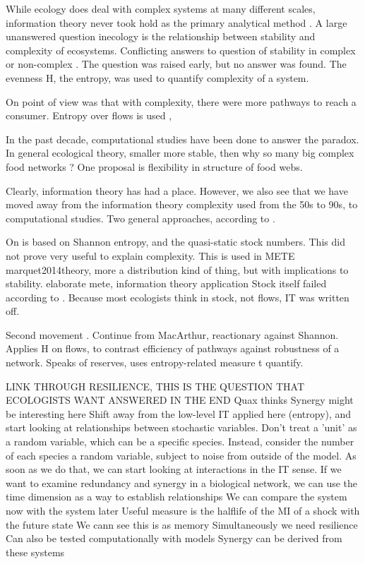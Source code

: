 \documentclass[../main.tex]{subfiles}
\begin{document}
While ecology does deal with complex systems at many different scales, information theory never took hold as the primary analytical method \cite{ulanowicz2001information}. %
A large unanswered question inecology is the relationship between stability and complexity of ecosystems.
Conflicting answers to question of stability in complex or non-complex \cite{pimm1984complexity}.
The question was raised early, but no answer was found.
The evenness H, the entropy, was used to quantify complexity of a system.

On point of view was that with complexity, there were more pathways to reach a consumer.
Entropy over flows is used \cite{macarthur1955fluctuations},

In the past decade, computational studies have been done to answer the paradox. 
In general ecological theory, smaller more stable, then why so many big complex food networks \cite{kondoh2003foraging}?
One proposal is flexibility in structure of food webs.

Clearly, information theory has had a place.
However, we also see that we have moved away from the information theory complexity used from the 50s to 90s, to computational studies.
Two general approaches, according to \citep{ulanowicz2001information}.

On is based on Shannon entropy, and the quasi-static stock numbers.
This did not prove very useful to explain complexity.
This is used in METE marquet2014theory, more a distribution kind of thing, but with implications to stability.
elaborate mete, information theory application \cite{phillips2006maximum} %
Stock itself failed according to \citep{ulanowicz2001information}.
Because most ecologists think in stock, not flows, IT was written off.

Second movement \cite{ulanowicz2009quantifying}.
Continue from MacArthur, reactionary against Shannon.
Applies H on flows, to contrast efficiency of pathways against robustness of a network.
Speaks of reserves, uses entropy-related measure t quantify.

LINK THROUGH RESILIENCE, THIS IS THE QUESTION THAT ECOLOGISTS WANT ANSWERED IN THE END
Quax thinks \cite{quax2017quantifying}
Synergy might be interesting here
Shift away from the low-level IT applied here (entropy), and start looking at relationships between stochastic variables.
Don't treat a 'unit' as a random variable, which can be a specific species.
Instead, consider the number of each species a random variable, subject to noise from outside of the model.
As soon as we do that, we can start looking at interactions in the IT sense.
If we want to examine redundancy and synergy in a biological network, we can use the time dimension as a way to establish relationships
We can compare the system now with the system later
Useful measure is the halflife of the MI of a shock with the future state \cite{QuaxPersonal}
We cann see this is as memory
Simultaneously we need resilience
Can also be tested computationally with models
Synergy can be derived from these systems
\end{document}
